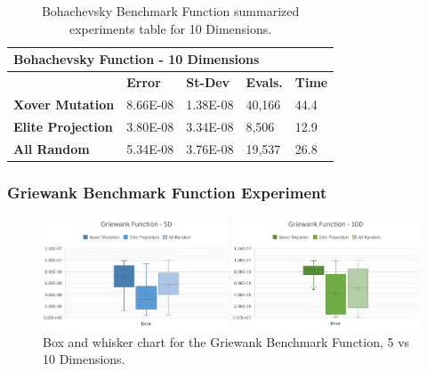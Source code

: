 \documentclass[graybox]{svmult}
\begin{document}
            \begin{table}[]
                \scriptsize
                \centering
                \caption{Bohachevsky Benchmark Function summarized experiments table for 10 Dimensions.}\label{tab.fun_bohachevsky10}
                \begin{tabular}{@{}lllll@{}}
                \toprule
                \multicolumn{5}{l}{\textbf{Bohachevsky Function - 10 Dimensions}} \\ \midrule
                & \textbf{Error} & \textbf{St-Dev} & \textbf{Evals.} & \textbf{Time} \\
                \textbf{Xover Mutation} & 8.66E-08 & 1.38E-08 & 40,166 & 44.4 \\
                \textbf{Elite Projection} & 3.80E-08 & 3.34E-08 & 8,506 & 12.9 \\
                \textbf{All Random} & 5.34E-08 & 3.76E-08 & 19,537 & 26.8 \\ \bottomrule
                \end{tabular}
                \end{table}


        \subsubsection{Griewank Benchmark Function Experiment}

            \begin{figure}
                \includegraphics[width=\linewidth, frame]{img/fig_fun_griewank.pdf}
                \caption{Box and whisker chart for the Griewank Benchmark Function, 5 vs 10 Dimensions.} \label{fig.fun_griewank}
                \end{figure}
\end{document}
